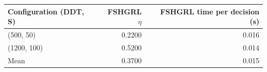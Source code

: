 \begin{tabular}{lrr}
\toprule
Configuration (DDT, S) & FSHGRL $\eta$ & FSHGRL time per decision (s) \\
\midrule
(500, 50) & 0.2200 & 0.016 \\
(1200, 100) & 0.5200 & 0.014 \\
Mean & 0.3700 & 0.015 \\
\bottomrule
\end{tabular}
